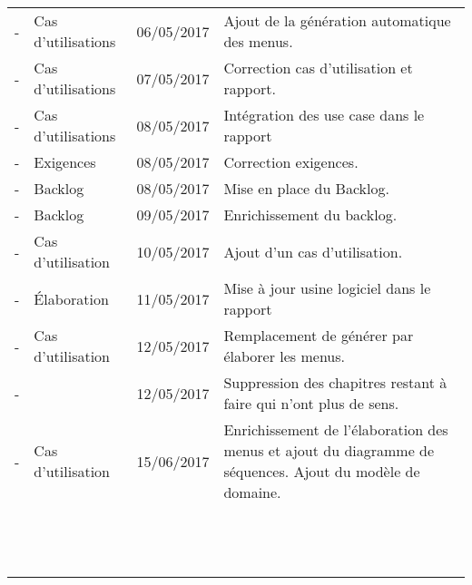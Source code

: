\begin{tabular}{|c|p{3.5cm}|c|p{9cm}|}
  - & Cas d'utilisations & 06/05/2017 & Ajout de la génération automatique des menus.\\
  - & Cas d'utilisations & 07/05/2017 & Correction cas d'utilisation et rapport.\\
  - & Cas d'utilisations & 08/05/2017 & Intégration des use case dans le rapport\\
  - & Exigences & 08/05/2017 & Correction exigences.\\
  - & Backlog & 08/05/2017 & Mise en place du Backlog.\\
  - & Backlog & 09/05/2017 & Enrichissement du backlog.\\
  - & Cas d'utilisation  & 10/05/2017 & Ajout d'un cas d'utilisation.\\
  - & Élaboration  & 11/05/2017 & Mise à jour usine logiciel dans le rapport\\
  - & Cas d'utilisation & 12/05/2017 & Remplacement de générer par élaborer les menus.\\
  - & & 12/05/2017 & Suppression des chapitres restant à faire qui n'ont plus de sens.\\
  - & Cas d'utilisation & 15/06/2017 & Enrichissement de l'élaboration des menus et ajout du diagramme de séquences. Ajout du modèle de domaine.\\
  &&&\\
  &&&\\
  &&&\\
  &&&\\
  &&&\\
  &&&\\
  &&&\\
  &&&\\
  &&&\\
  &&&\\
  &&&\\
  &&&\\
  &&&\\ \hline
\end{tabular}
